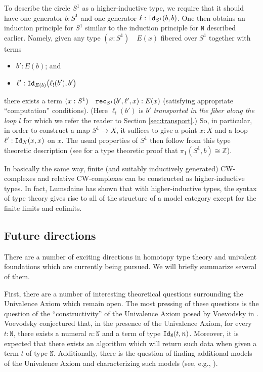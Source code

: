\documentclass[11pt]{amsart}
\newcommand{\iso}{\cong}
\newcommand{\id}[1]{\textnormal{\texttt{Id}}_{#1}}
\newcommand{\nat}{\mathtt{N}}
\newcommand{\rec}{\textnormal{\texttt{rec}}}
\newcommand{\judge}[2]{(#1)\quad #2}
\theoremstyle{definition}
\theoremstyle{remark}
\numberwithin{equation}{section}
\begin{document}
To describe the circle $S^{1}$ as a higher-inductive type, we require
that it should have one generator $b : S^{1}$ and one generator
$\ell:\id{S^{1}}(b,b)$.  One then obtains an induction principle for
$S^{1}$ similar to the induction principle for $\nat$ described
earlier.  Namely, given any type $\judge{x:S^{1}}{E(x)}$ fibered over
$S^{1}$ together with terms
\begin{itemize}
\item $b':E(b)$; and
\item $\ell':\id{E(b)}\bigl(\ell_{!}(b'),b'\bigr)$
\end{itemize}
there exists a term $\judge{x:S^{1}}{\rec_{S^{1}}(b',\ell',x):E(x)}$
(satisfying appropriate ``computation'' conditions).  (Here
$\ell_{!}(b')$ is $b'$ \emph{transported in the fiber along the loop $l$}
for which we refer the reader to Section \ref{sec:transport}.)  So, in
particular, in order to construct a map $S^{1}\to X$, it suffices to
give a point $x:X$ and a loop $\ell':\id{X}(x,x)$ on $x$.  The usual
properties of $S^{1}$ then follow from this type theoretic description
(see \cite{Shulman:S1Z} for a type theoretic proof that $\pi_{1}(S^{1},b)\iso\mathbb{Z}$).

In basically the same way, finite (and suitably inductively generated)
CW-complexes and relative CW-complexes can be constructed as
higher-inductive types.  In fact, Lumsdaine \cite{Lumsdaine:MSHIT} has shown that
with higher-inductive types, the syntax of type theory gives rise to
all of the structure of a model category except for the finite
limits and colimits.

\subsection{Future directions}

There are a number of exciting directions in homotopy type theory and
univalent foundations which are currently being pursued.  We will
briefly summarize several of them.

First, there are a number of interesting theoretical questions
surrounding the Univalence Axiom which remain open.  The most pressing
of these questions is the question of the ``constructivity'' of the
Univalence Axiom posed by Voevodsky in \cite{Vo2012}.  Voevodsky
conjectured that, in the presence of the Univalence Axiom, for every
$t:\nat$, there exists a numeral $n:\nat$ and a term of type
$\id{\nat}(t,n)$.  Moreover, it is expected that there exists an
algorithm which will return such data when given a term $t$ of type
$\nat$.  Additionally, there is the question of finding additional
models of the Univalence Axiom and characterizing such models (see,
e.g., \cite{Shulman:UAID}).
\end{document}
